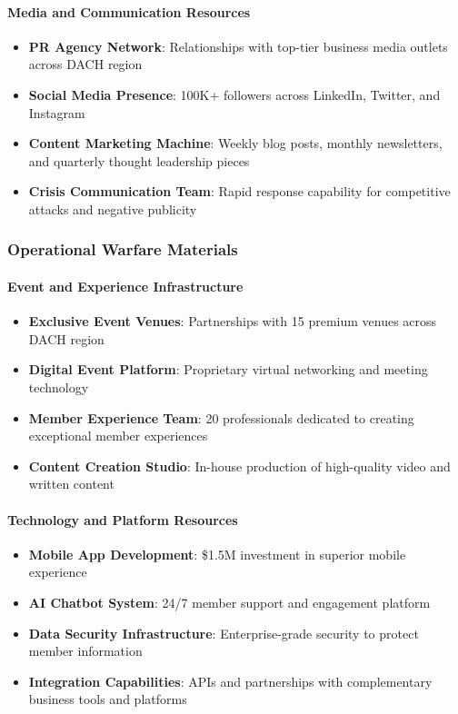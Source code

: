 \paragraph{Media and Communication Resources}
\begin{itemize}
    \item \textbf{PR Agency Network}: Relationships with top-tier business media outlets across DACH region
    \item \textbf{Social Media Presence}: 100K+ followers across LinkedIn, Twitter, and Instagram
    \item \textbf{Content Marketing Machine}: Weekly blog posts, monthly newsletters, and quarterly thought leadership pieces
    \item \textbf{Crisis Communication Team}: Rapid response capability for competitive attacks and negative publicity
\end{itemize}

\subsubsection{Operational Warfare Materials}

\paragraph{Event and Experience Infrastructure}
\begin{itemize}
    \item \textbf{Exclusive Event Venues}: Partnerships with 15 premium venues across DACH region
    \item \textbf{Digital Event Platform}: Proprietary virtual networking and meeting technology
    \item \textbf{Member Experience Team}: 20 professionals dedicated to creating exceptional member experiences
    \item \textbf{Content Creation Studio}: In-house production of high-quality video and written content
\end{itemize}

\paragraph{Technology and Platform Resources}
\begin{itemize}
    \item \textbf{Mobile App Development}: \$1.5M investment in superior mobile experience
    \item \textbf{AI Chatbot System}: 24/7 member support and engagement platform
    \item \textbf{Data Security Infrastructure}: Enterprise-grade security to protect member information
    \item \textbf{Integration Capabilities}: APIs and partnerships with complementary business tools and platforms
\end{itemize}

